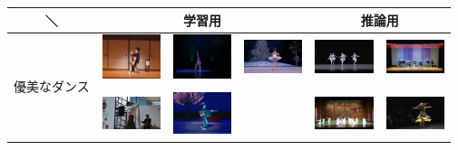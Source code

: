 \begin{table}[t]
  \begin{center}
    \begin{tabular}{|c|c|c|c|c|c|} \hline
      ＼ & \multicolumn{3}{|c|}{学習用} & \multicolumn{2}{|c|}{推論用} \\ \hline
      \multirow{4}{*}{優美なダンス}
        & \includegraphics[width=17mm]{images/snaps/japanese_elegant.png}
        & \includegraphics[width=17mm]{images/snaps/chinese_elegant.png}
        & \includegraphics[width=17mm]{images/snaps/ballet_elegant.png}
        & \includegraphics[width=17mm]{images/snaps/ballet_group_elegant.png}
        & \includegraphics[width=17mm]{images/snaps/japanese_group_elegant.png}
      \\ \cline{2-6}
        & \cite{jpn} & \cite{china} & \cite{ballet} & \cite{balletgroup} & \cite{jpngroup}
      \\ \cline{2-6}
        & \includegraphics[width=17mm]{images/snaps/thai_elegant.png}
        & \includegraphics[width=17mm]{images/snaps/japanese2_elegant.png}
        &
        & \includegraphics[width=17mm]{images/snaps/chinese_group_elegant.png}
        & \includegraphics[width=17mm]{images/snaps/belly_elegant.png}

\end{tabular}
\end{center}
\end{table}
